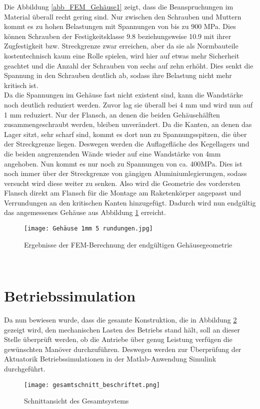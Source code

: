 Die Abbildung \ref{abb_FEM_Gehäuse1} zeigt, dass die Beanspruchungen im Material überall recht gering sind. Nur zwischen den Schrauben und Muttern kommt es zu hohen Belastungen mit Spannungen von bis zu $900$ MPa. Dies können Schrauben der Festigkeitsklasse 9.8 beziehungsweise 10.9 mit ihrer Zugfestigkeit bzw. Streckgrenze zwar erreichen, aber da sie als Normbauteile kostentechnisch kaum eine Rolle spielen, wird hier auf etwas mehr Sicherheit geachtet und die Anzahl der Schrauben von sechs auf zehn erhöht. Dies senkt die Spannung in den Schrauben deutlich ab, sodass ihre Belastung nicht mehr kritisch ist.\\
Da die Spannungen im Gehäuse fast nicht existent sind, kann die Wandstärke noch deutlich reduziert werden. Zuvor lag sie überall bei 4 mm und wird nun auf 1 mm reduziert. Nur der Flansch, an denen die beiden Gehäusehälften zusammengeschraubt werden, bleiben unverändert. Da die Kanten, an denen das Lager sitzt, sehr scharf sind, kommt es dort nun zu Spannungsspitzen, die über der Streckgrenze liegen. Deswegen werden die Auflagefläche des Kegellagers und die beiden angrenzenden Wände wieder auf eine Wandstärke von 4mm angehoben. Nun kommt es nur noch zu Spannungen von ca. 400MPa. Dies ist noch immer über der Streckgrenze von gängigen Aluminiumlegierungen, sodass versucht wird diese weiter zu senken. Also wird die Geometrie des vordersten Flansch direkt am Flansch für die Montage am Raketenkörper angepasst und Verrundungen an den kritischen Kanten hinzugefügt. Dadurch wird nun endgültig das angemessenes Gehäuse aus Abbildung \ref{abb_FEM_Gehäuse2} erreicht.
\begin{figure}[h] 
	\centering
	\texttt{[image: Gehäuse 1mm 5 rundungen.jpg]}
	\caption{Ergebnisse der FEM-Berechnung der endgültigen Gehäusegeometrie}
	\label{abb_FEM_Gehäuse2}
\end{figure}\\
\section{Betriebssimulation}\label{sec:betriebssim}
Da nun bewiesen wurde, dass die gesamte Konstruktion, die in Abbildung \ref{abb_gesamt_sys} gezeigt wird, den mechanischen Lasten des Betriebs stand hält, soll an dieser Stelle überprüft werden, ob die Antriebe über genug Leistung verfügen die gewünschten Manöver durchzuführen. Deswegen werden zur Überprüfung der Aktuatorik Betriebssimulationen in der Matlab-Anwendung Simulink durchgeführt.
\begin{figure}[h] 
	\centering
	\texttt{[image: gesamtschnitt\_beschriftet.png]}
	\caption{Schnittansicht des Gesamtsystems}
	\label{abb_gesamt_sys}
\end{figure}
